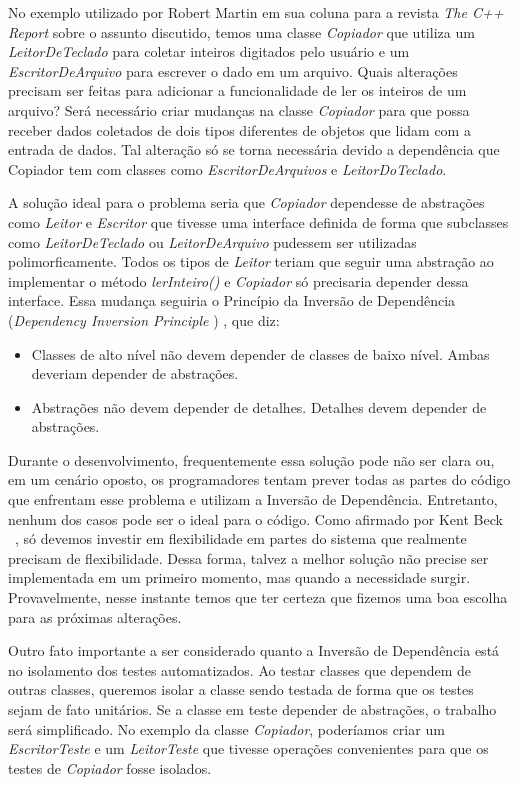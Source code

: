 No exemplo utilizado por Robert Martin em sua coluna para a revista \textit{The C++ Report} \citep{CppReport}
sobre o assunto discutido, temos uma classe  \textit{Copiador} que utiliza um \textit{LeitorDeTeclado} para coletar inteiros digitados pelo usuário e um  \textit{EscritorDeArquivo} para escrever o dado em um arquivo. Quais alterações precisam ser feitas  para adicionar a funcionalidade de ler os inteiros de um arquivo? Será necessário criar mudanças na classe  \textit{Copiador} para que possa receber dados coletados de dois tipos diferentes de objetos que lidam com a entrada de dados. Tal alteração só se torna necessária devido a dependência que Copiador tem com classes como \textit{EscritorDeArquivos} e \textit{LeitorDoTeclado}.
	
A solução ideal para o problema seria que  \textit{Copiador} dependesse de abstrações como \textit{Leitor} e  \textit{Escritor} que tivesse uma interface definida de forma que subclasses como  \textit{LeitorDeTeclado} ou  \textit{LeitorDeArquivo} pudessem ser utilizadas polimorficamente. Todos os tipos de  \textit{Leitor} teriam que seguir uma abstração ao implementar o método  \textit{lerInteiro()} e  \textit{Copiador} só precisaria depender dessa interface. Essa mudança seguiria o Princípio da Inversão de Dependência (\textit{Dependency Inversion Principle} \citep{Martin97c}) , que diz:
	
\begin{itemize}
 	\item Classes de alto nível não devem depender de classes de baixo nível. Ambas deveriam depender de abstrações.
	\item Abstrações não devem depender de detalhes. Detalhes devem depender de abstrações.
\end{itemize}

Durante o desenvolvimento, frequentemente essa solução pode não ser clara ou, em um cenário oposto, os programadores tentam prever todas as partes do código que enfrentam esse problema e utilizam a Inversão de Dependência. Entretanto, nenhum dos casos pode ser o ideal para o código. Como afirmado por Kent Beck ~\citep{Beck2007}, só devemos investir em flexibilidade em partes do sistema que realmente precisam de flexibilidade. Dessa forma, talvez a melhor solução não precise ser implementada em um primeiro momento, mas quando a necessidade surgir. Provavelmente, nesse instante temos que ter certeza que fizemos uma boa escolha para as próximas alterações.

Outro fato importante a ser considerado quanto a Inversão de Dependência está no isolamento dos testes automatizados. Ao testar classes que dependem 
de outras classes, queremos isolar a classe sendo testada de forma que os testes sejam de fato unitários. Se a classe em teste depender de 
abstrações, o trabalho será simplificado. No exemplo da classe \textit{Copiador}, poderíamos criar um \textit{EscritorTeste} e um 
\textit{LeitorTeste} que tivesse operações convenientes para que os testes de \textit{Copiador} fosse isolados.



